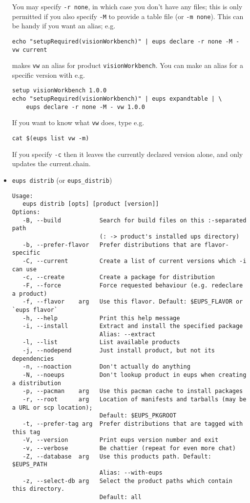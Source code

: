 \documentclass{article}
\newcommand{\code}[1]{\texttt{#1}}
\begin{document}
\begin{itemize}
You may specify \code{-r none}, in which case you don't have any files; this
is only permitted if you also specify \code{-M} to provide a table file (or \code{-m none}).
This can be handy if you want an alias; e.g.
\begin{verbatim}
echo "setupRequired(visionWorkbench)" | eups declare -r none -M - vw current
\end{verbatim}
makes \code{vw} an alias for product \code{visionWorkbench}. You can make
an alias for a specific version with e.g.
\begin{verbatim}
setup visionWorkbench 1.0.0
echo "setupRequired(visionWorkbench)" | eups expandtable | \
	eups declare -r none -M - vw 1.0.0
\end{verbatim}

If you want to
know what \code{vw} does, type e.g.
\begin{verbatim}
cat $(eups list vw -m)
\end{verbatim}				%

If you specify \code{-c} then it leaves the currently declared version alone, and
only updates the current.chain.


  \item \code{eups distrib} (or \code{eups\_distrib})
\begin{verbatim}
Usage:
   eups distrib [opts] [product [version]]
Options:
   -B, --build           Search for build files on this :-separated path
                         (: -> product's installed ups directory)
   -b, --prefer-flavor   Prefer distributions that are flavor-specific
   -C, --current         Create a list of current versions which -i can use
   -c, --create          Create a package for distribution
   -F, --force           Force requested behaviour (e.g. redeclare a product)
   -f, --flavor    arg   Use this flavor. Default: $EUPS_FLAVOR or `eups flavor`
   -h, --help            Print this help message
   -i, --install         Extract and install the specified package
                         Alias: --extract
   -l, --list            List available products
   -j, --nodepend        Just install product, but not its dependencies
   -n, --noaction        Don't actually do anything
   -N, --noeups          Don't lookup product in eups when creating a distribution
   -p, --pacman    arg   Use this pacman cache to install packages
   -r, --root      arg   Location of manifests and tarballs (may be a URL or scp location);
                         Default: $EUPS_PKGROOT
   -t, --prefer-tag arg  Prefer distributions that are tagged with this tag
   -V, --version         Print eups version number and exit
   -v, --verbose         Be chattier (repeat for even more chat)
   -Z, --database  arg   Use this products path. Default: $EUPS_PATH
                         Alias: --with-eups
   -z, --select-db arg   Select the product paths which contain this directory.
                         Default: all
\end{verbatim}				%


\end{itemize}
\end{document}
